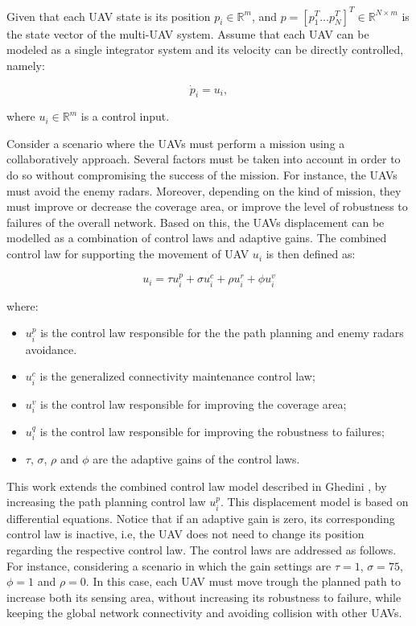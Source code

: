 Given that each UAV state is its position $p_i\in\mathbb{R}^m$,  and \mbox{$p=\left[p_1^T\ldots p_N^T\right]^T\in\mathbb{R}^{N \times m}$} is the state vector of the multi-UAV system. Assume that each UAV can be modeled as a single integrator system and its velocity can be directly controlled, namely:

\begin{equation}
\dot{p}_i = u_i,
\label{eq:singleintegrator}
\end{equation}

where $u_i\in \mathbb{R}^m$ is a control input.

Consider a scenario where the UAVs must perform a mission using a collaboratively approach. Several factors must be taken into account in order to do so without compromising the success of the mission. For instance, the UAVs must avoid the enemy radars. Moreover, depending on the kind of mission, they must improve or decrease the coverage area, or improve the level of robustness to failures of the overall network. Based on this, the UAVs displacement can be modelled as a combination of control laws and adaptive gains. The combined control law for supporting the movement of UAV $u_i$  is then defined as:

\begin{equation}
u_i=\tau u_i^p + \sigma u_i^c + \rho u_i^r + \phi u_i^v
\label{eq:integratedcontroller}
\end{equation}

where: 

\begin{itemize}
    \item $u_i^p$ is the control law responsible for the the path planning and enemy radars avoidance.
    \item $u_i^c$ is the generalized connectivity maintenance control law;    
    \item $u_i^v$ is the control law responsible for improving the coverage area;
    \item $u_i^q$ is the control law responsible for improving the robustness to failures;    
    \item $\tau$, $\sigma$, $\rho$ and $\phi$ are the adaptive gains of the control laws.
\end{itemize} 

This work extends the combined control law model described in Ghedini \cite{ghedini_2017}, by increasing the path planning control law $u_i^p$. This displacement model is based on differential equations. Notice that if an adaptive gain is zero, its corresponding control law is inactive, i.e, the UAV does not need to change its position regarding the respective control law. The control laws are addressed as follows. For instance, considering a scenario in which the gain settings are $\tau=1$, $\sigma=75$, $\phi=1$ and $\rho=0$. In this case, each UAV must move trough the planned path to increase both its sensing area, without increasing its robustness to failure, while keeping the global network connectivity and avoiding collision with other UAVs.

